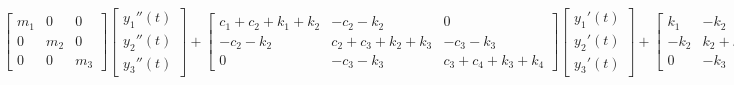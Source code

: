 \documentclass[12pt,a4paper]{article}
\begin{document}
\[
    \begin{bmatrix}
        m_1 & 0   & 0   \\
        0   & m_2 & 0   \\
        0   & 0   & m_3
    \end{bmatrix}
    \begin{bmatrix}
        y_1''(t) \\
        y_2''(t) \\
        y_3''(t)
    \end{bmatrix} +
    \begin{bmatrix}
        c_1+c_2+k_1+k_2 & -c_2-k_2       & 0              \\
        -c_2-k_2        & c_2+c_3+k_2+k_3 & -c_3-k_3       \\
        0               & -c_3-k_3        & c_3+c_4+k_3+k_4
    \end{bmatrix}
    \begin{bmatrix}
        y_1'(t) \\
        y_2'(t) \\
        y_3'(t)
    \end{bmatrix} +
    \begin{bmatrix}
        k_1 & -k_2 & 0   \\
        -k_2 & k_2+k_3 & -k_3 \\
        0   & -k_3 & k_3+k_4
    \end{bmatrix}
    \begin{bmatrix}
        y_1(t) \\
        y_2(t) \\
        y_3(t)
    \end{bmatrix} =
    \begin{bmatrix}
        u_1(t) \\
        u_2(t) \\
        u_3(t)
    \end{bmatrix}
\]
\end{document}
